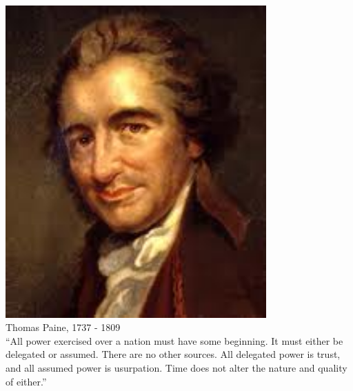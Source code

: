 \begin{frame}
    \begin{columns}[c]
            \centering
            \includegraphics[width=0.75\textwidth]{img/thomas-paine.png} \\
            Thomas Paine, 1737 - 1809 \\
            ``All power exercised over a nation must have some beginning. It
            must either be delegated or assumed. There are no other sources.
            All delegated power is trust, and all assumed power is usurpation.
            Time does not alter the nature and quality of either.''
    \end{columns}
\end{frame}


